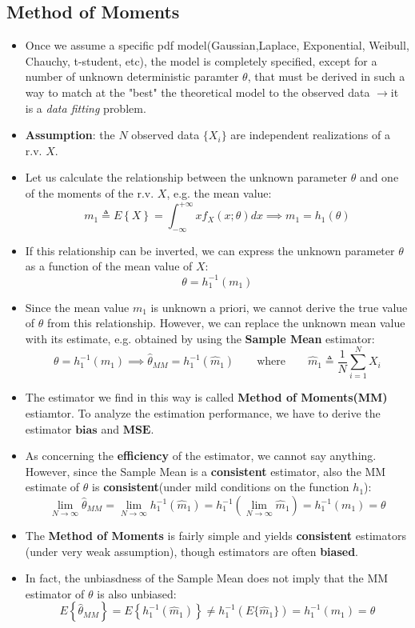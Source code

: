 \subsection{Method of Moments}
\begin{itemize}
    \item Once we assume a specific pdf model(Gaussian,Laplace, Exponential, Weibull, Chauchy, t-student, etc), the model is completely specified, except for a number of unknown deterministic paramter \(\theta\), that must be derived in such a way to match at the "best" the theoretical model to the observed data \(\rightarrow\)it is a \textit{data fitting} problem.
    \item \textbf{Assumption}: the \(N\) observed data \(\{X_i\}\) are independent realizations of a r.v. \(X\).
    \item Let us calculate the relationship between the unknown parameter \(\theta\) and one of the moments of the r.v. \(X\), e.g. the mean value:
$$
m_1 \triangleq E\left\{ X \right\} = \int_{-\infty}^{+\infty} x f_X(x; \theta) dx \implies m_1 = h_1(\theta)
$$

    \item If this relationship can be inverted, we can express the unknown parameter \(\theta\) as a function of the mean value of \(X\):
    \[
    \theta=h_1^{-1}(m_1)
    \]
    \item Since the mean value \(m_1\) is unknown a priori, we cannot derive the true value of \(\theta\) from this relationship. However, we can replace the unknown mean value with its estimate, e.g. obtained by using the \textbf{Sample Mean} estimator:
    $$
\theta = h_1^{-1}(m_1) \implies \hat{\theta}_{MM} = h_1^{-1}(\hat{m}_1)
\qquad \text{where} \qquad \hat{m}_1 \triangleq \frac{1}{N} \sum_{i=1}^{N} X_i
$$
    \item The estimator we find in this way is called \textbf{Method of Moments(MM)} estiamtor. To analyze the estimation performance, we have to derive the estimator \(\textbf{bias}\) and \(\textbf{MSE}\).
    \item As concerning the \textbf{efficiency} of the estimator, we cannot say anything. However, since the Sample Mean is a \textbf{consistent} estimator, also the MM estimate of \(\theta\) is \textbf{consistent}(under mild conditions on the function \(h_1\)):
    $$
\lim_{N \to \infty} \hat{\theta}_{MM} = \lim_{N \to \infty} h_1^{-1}(\hat{m}_1) = h_1^{-1}\left( \lim_{N \to \infty} \hat{m}_1 \right) = h_1^{-1}(m_1) = \theta
$$


    \item The \textbf{Method of Moments} is fairly simple and yields \textbf{consistent} estimators (under very weak assumption), though estimators are often \textbf{biased}.
    \item In fact, the unbiasdness of the Sample Mean does not imply that the MM estimator of \(\theta\) is also unbiased:
 $$
E\left\{ \hat{\theta}_{MM} \right\} = E\left\{ h_1^{-1}(\hat{m}_1) \right\} \neq h_1^{-1}\left( E\{\hat{m}_1\} \right) = h_1^{-1}(m_1) = \theta
$$




\end{itemize}
